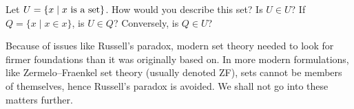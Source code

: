 \begin{exc}
Let $U=\{x \mid x \text{ is a set}\}$. How would you describe this set? Is $U \in U$? If $Q=\{x \mid x \in x\}$, is $U \in Q$? Conversely, is $Q \in U$?
\end{exc}

Because of issues like Russell's paradox, modern set theory needed to look for firmer foundations than it was originally based on. In more modern formulations, like Zermelo–Fraenkel  set theory (usually denoted ZF), sets cannot be members of themselves, hence Russell's paradox is avoided. We shall not go into these matters further. 